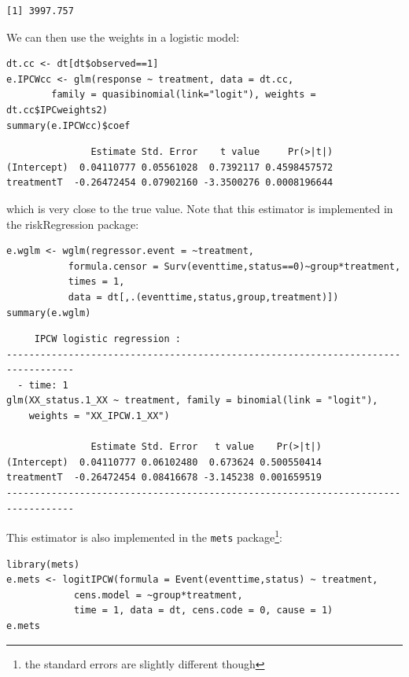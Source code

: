 \documentclass[12pt]{article}
\begin{document}
\begin{verbatim}
[1] 3997.757
\end{verbatim}


We can then use the weights in a logistic model:
\lstset{language=r,label= ,caption= ,captionpos=b,numbers=none}
\begin{lstlisting}
dt.cc <- dt[dt$observed==1]
e.IPCWcc <- glm(response ~ treatment, data = dt.cc,
		family = quasibinomial(link="logit"), weights = dt.cc$IPCweights2)
summary(e.IPCWcc)$coef
\end{lstlisting}

\begin{verbatim}
               Estimate Std. Error    t value     Pr(>|t|)
(Intercept)  0.04110777 0.05561028  0.7392117 0.4598457572
treatmentT  -0.26472454 0.07902160 -3.3500276 0.0008196644
\end{verbatim}


which is very close to the true value. Note that this estimator is
implemented in the riskRegression package:
\lstset{language=r,label= ,caption= ,captionpos=b,numbers=none}
\begin{lstlisting}
e.wglm <- wglm(regressor.event = ~treatment,
	       formula.censor = Surv(eventtime,status==0)~group*treatment,
	       times = 1, 
	       data = dt[,.(eventtime,status,group,treatment)])
summary(e.wglm)
\end{lstlisting}

\begin{verbatim}
     IPCW logistic regression : 
----------------------------------------------------------------------------------
  - time: 1
glm(XX_status.1_XX ~ treatment, family = binomial(link = "logit"), 
    weights = "XX_IPCW.1_XX")

               Estimate Std. Error   t value    Pr(>|t|)
(Intercept)  0.04110777 0.06102480  0.673624 0.500550414
treatmentT  -0.26472454 0.08416678 -3.145238 0.001659519
----------------------------------------------------------------------------------
\end{verbatim}

This estimator is also implemented in the \texttt{mets} package\footnote{the standard errors are slightly different though}:
\lstset{language=r,label= ,caption= ,captionpos=b,numbers=none}
\begin{lstlisting}
library(mets)
e.mets <- logitIPCW(formula = Event(eventtime,status) ~ treatment,
		    cens.model = ~group*treatment,
		    time = 1, data = dt, cens.code = 0, cause = 1)
e.mets
\end{lstlisting}
\end{document}
